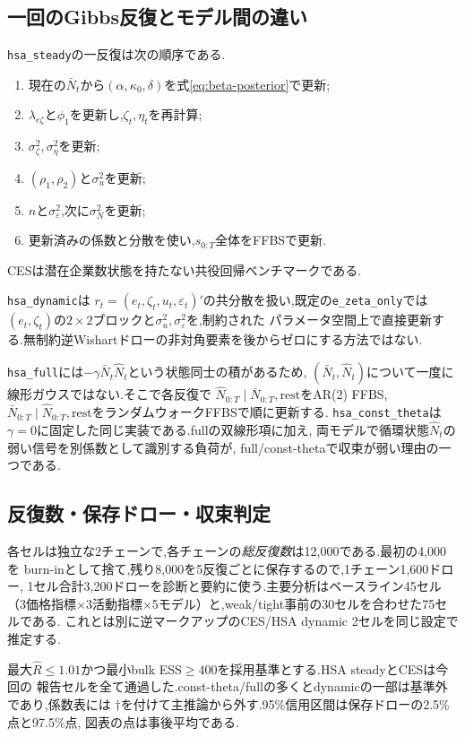 \documentclass[11pt]{article}
\newcommand{\code}[1]{\texttt{#1}}
\begin{document}
\subsection{一回のGibbs反復とモデル間の違い}
\code{hsa\_steady}の一反復は次の順序である.
\begin{enumerate}
\item 現在の$\bar N_t$から$(\alpha,\kappa_0,\delta)$を式\eqref{eq:beta-posterior}で更新;
\item $\lambda_{e\zeta}$と$\phi_1$を更新し,$\zeta_t,\eta_t$を再計算;
\item $\sigma_\zeta^2,\sigma_\eta^2$を更新;
\item $(\rho_1,\rho_2)$と$\sigma_u^2$を更新;
\item $n$と$\sigma_\varepsilon^2$,次に$\sigma_N^2$を更新;
\item 更新済みの係数と分散を使い,$s_{0:T}$全体をFFBSで更新.
\end{enumerate}
CESは潜在企業数状態を持たない共役回帰ベンチマークである.\par
\code{hsa\_dynamic}は
$r_t=(e_t,\zeta_t,u_t,\varepsilon_t)'$の共分散を扱い,既定の\code{e\_zeta\_only}では
$(e_t,\zeta_t)$の$2\times2$ブロックと$\sigma_u^2,\sigma_\varepsilon^2$を,制約された
パラメータ空間上で直接更新する.無制約逆Wishartドローの非対角要素を後からゼロにする方法ではない.

\code{hsa\_full}には$-\gamma\bar N_t\hat N_t$という状態同士の積があるため,
$(\bar N_t,\hat N_t)$について一度に線形ガウスではない.そこで各反復で
$\hat N_{0:T}\mid\bar N_{0:T},\text{rest}$をAR(2) FFBS,
$\bar N_{0:T}\mid\hat N_{0:T},\text{rest}$をランダムウォークFFBSで順に更新する.
\code{hsa\_const\_theta}は$\gamma=0$に固定した同じ実装である.fullの双線形項に加え,
両モデルで循環状態$\hat N_t$の弱い信号を別係数として識別する負荷が,
full/const-thetaで収束が弱い理由の一つである.

\subsection{反復数・保存ドロー・収束判定}
各セルは独立な2チェーンで,各チェーンの\emph{総反復数}は12,000である.最初の4,000を
burn-inとして捨て,残り8,000を5反復ごとに保存するので,1チェーン1,600ドロー,
1セル合計3,200ドローを診断と要約に使う.主要分析はベースライン45セル
（3価格指標$\times$3活動指標$\times$5モデル）と,weak/tight事前の30セルを合わせた75セルである.
これとは別に逆マークアップのCES/HSA dynamic 2セルを同じ設定で推定する.

最大$\hat R\leq1.01$かつ最小bulk ESS$\geq400$を採用基準とする.HSA steadyとCESは今回の
報告セルを全て通過した.const-theta/fullの多くとdynamicの一部は基準外であり,係数表には
$\dagger$を付けて主推論から外す.95\%信用区間は保存ドローの2.5\%点と97.5\%点,
図表の点は事後平均である.
\end{document}
